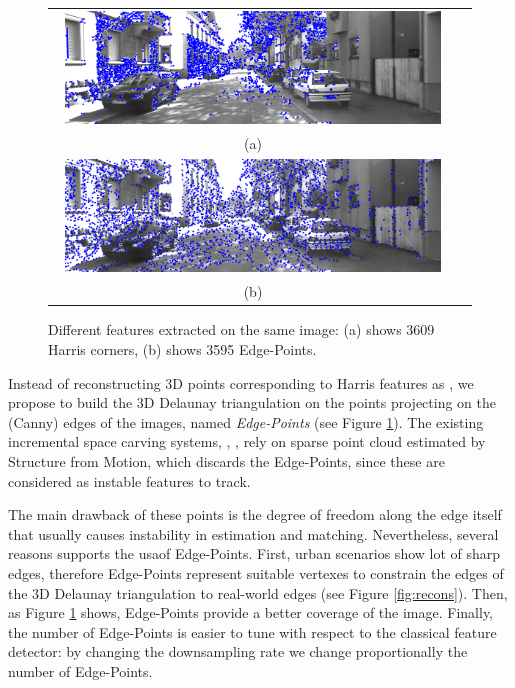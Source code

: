 \begin{figure}[tp]
\centering
\begin{tabular}{cc}
\includegraphics[width=0.95\textwidth]{./img//harris}\\
(a)\\
\includegraphics[width=0.95\textwidth]{./img//edgepoints}\\
(b)\\
\end{tabular}
\caption{Different features extracted on the same image: (a) shows 3609 Harris corners, (b) shows 3595 Edge-Points.}
\label{fig:Edge-Points}
\end{figure}



Instead of reconstructing 3D points corresponding to Harris features as \cite{litvinov_lhuillier_13}, we propose to build the 3D Delaunay triangulation on the points projecting on the (Canny) edges of the images, named \emph{Edge-Points} (see Figure \ref{fig:Edge-Points}). 
The existing incremental space carving systems, \eg, \cite{litvinov_Lhiuller14, litvinov_lhuillier_13, lovi_et_al_11}, rely on sparse point cloud estimated by Structure from Motion, which discards the Edge-Points, since these are considered as instable features to track.

The main drawback of these points is the degree of freedom along the edge itself that usually causes instability in estimation and matching.
Nevertheless, several reasons supports the usaof Edge-Points.
First, urban scenarios show lot of sharp edges, therefore Edge-Points represent suitable vertexes to constrain the edges of the 3D Delaunay triangulation to real-world edges (see Figure \ref{fig:recons}). 
Then, as Figure \ref{fig:Edge-Points} shows, Edge-Points provide a better coverage of the image.
Finally, the number of Edge-Points is easier to tune with respect to the classical feature detector: by changing the downsampling rate we change proportionally the number of Edge-Points.


